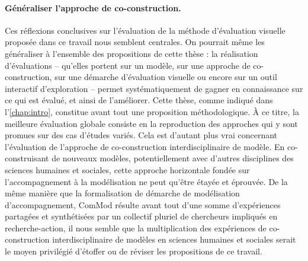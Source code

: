 \paragraph{Généraliser l'approche de co-construction.}
Ces réflexions conclusives sur l'évaluation de la méthode d'évaluation visuelle proposée dans ce travail nous semblent centrales.
On pourrait même les généraliser à l'ensemble des propositions de cette thèse :
	la réalisation d'évaluations -- qu'elles portent sur un modèle, sur une approche de co-construction, sur une démarche d'évaluation visuelle ou encore sur un outil interactif d'exploration -- permet systématiquement de gagner en connaissance sur ce qui est évalué, et ainsi de l'améliorer.
Cette thèse, comme indiqué dans l'\cref{chap:intro}, constitue avant tout une proposition méthodologique.
À ce titre, la meilleure évaluation globale consiste en la reproduction des approches qui y sont promues sur des cas d'études variés.
Cela est d'autant plus vrai concernant l'évaluation de l'approche de co-construction interdisciplinaire de modèle.
En co-construisant de nouveaux modèles, potentiellement avec d'autres disciplines des sciences humaines et sociales, cette approche horizontale fondée sur l'accompagnement à la modélisation ne peut qu'être étayée et éprouvée.
De la même manière que la formalisation de démarche de modélisation d'accompagnement, ComMod \autocite{commod_modelisation_2005} résulte avant tout d'une somme d'expériences partagées et synthétisées par un collectif pluriel de chercheurs impliqués en recherche-action, il nous semble que la multiplication des expériences de co-construction interdisciplinaire de modèles en sciences humaines et sociales serait le moyen privilégié d'étoffer ou de réviser les propositions de ce travail.